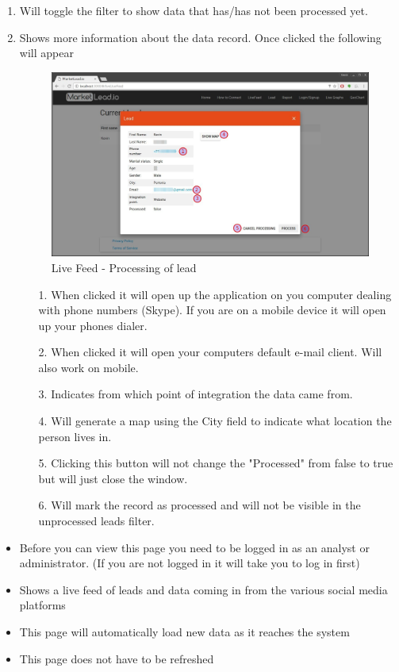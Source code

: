 \documentclass{article}
\begin{document}
			\begin{enumerate}
				\item Will toggle the filter to show data that has/has not been processed yet.
				\item Shows more information about the data record. Once clicked the following will appear
					\begin{figure}[H]
						\includegraphics[width=\textwidth]{images/live_feed_process}
						\caption{Live Feed - Processing of lead}
					\end{figure}

					\begin{itemize}
						\item[1.] When clicked it will open up the application on you computer dealing with phone numbers (Skype). If you are on a mobile device it will open up your phones dialer.
						\item[2.] When clicked it will open your computers default e-mail client. Will also work on mobile.
						\item[3.] Indicates from which point of integration the data came from.
						\item[4.] Will generate a map using the City field to indicate what location the person lives in.
						\item[5.] Clicking this button will not change the "Processed" from false to true but will just close the window.
						\item[6.] Will mark the record as processed and will not be visible in the unprocessed leads filter.
					\end{itemize}
			\end{enumerate}

			\begin{itemize}
				\item Before you can view this page you need to be logged in as an analyst or administrator. (If you are not logged in it will take you to log in first)
				\item Shows a live feed of leads and data coming in from the various social media platforms
				\item This page will automatically load new data as it reaches the system
				\item This page does not have to be refreshed
			\end{itemize}
\end{document}
